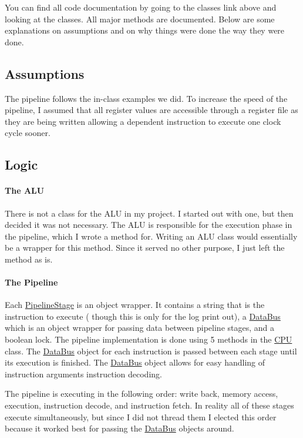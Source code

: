 You can find all code documentation by going to the classes link above and looking at the classes. All major methods are documented. Below are some explanations on assumptions and on why things were done the way they were done.

\subsection*{Assumptions}

The pipeline follows the in-\/class examples we did. To increase the speed of the pipeline, I assumed that all register values are accessible through a register file as they are being written allowing a dependent instruction to execute one clock cycle sooner.

\subsection*{Logic}

\paragraph*{The A\+LU}

There is not a class for the A\+LU in my project. I started out with one, but then decided it was not necessary. The A\+LU is responsible for the execution phase in the pipeline, which I wrote a method for. Writing an A\+LU class would essentially be a wrapper for this method. Since it served no other purpose, I just left the method as is.

\paragraph*{The Pipeline}

Each \mbox{\hyperlink{class_pipeline_stage}{Pipeline\+Stage}} is an object wrapper. It contains a string that is the instruction to execute ( though this is only for the log print out), a \mbox{\hyperlink{class_data_bus}{Data\+Bus}} which is an object wrapper for passing data between pipeline stages, and a boolean lock. The pipeline implementation is done using 5 methods in the \mbox{\hyperlink{class_c_p_u}{C\+PU}} class. The \mbox{\hyperlink{class_data_bus}{Data\+Bus}} object for each instruction is passed between each stage until its execution is finished. The \mbox{\hyperlink{class_data_bus}{Data\+Bus}} object allows for easy handling of instruction arguments instruction decoding.

The pipeline is executing in the following order\+: write back, memory access, execution, instruction decode, and instruction fetch. In reality all of these stages execute simultaneously, but since I did not thread them I elected this order because it worked best for passing the \mbox{\hyperlink{class_data_bus}{Data\+Bus}} objects around.


